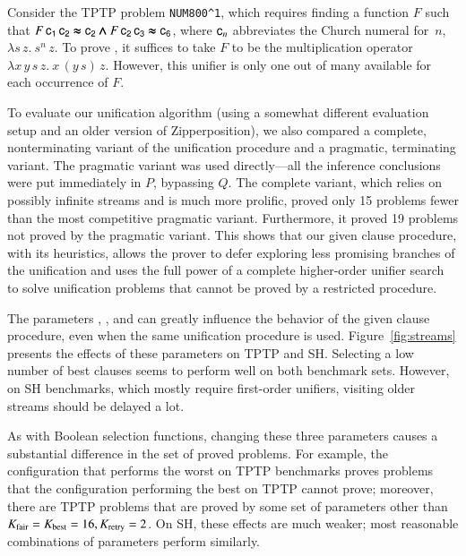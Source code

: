 Consider the TPTP problem \verb|NUM800^1|, which requires finding
a function $F$ such that $F \, \mathsf{c_1} \, \mathsf{c_2}
\pmb{\approx} \mathsf{c_2} \pmb{\land} F \, \mathsf{c_2} \, \mathsf{c_3} \pmb{\approx} \mathsf{c_6}$, where
$\mathsf{c}_n$ abbreviates the Church numeral for~$n$, $\lambda s\, z. \>
s^n \, z$. To prove
, it suffices to take $F$ to be the multiplication operator
$\lambda x \, y \, s \, z. \> x \, (y \, s) \, z$.
However, this unifier is only one out of many available for each occurrence of
$F$.

To evaluate our unification algorithm (using a somewhat different
evaluation setup and an older version of Zipperposition), we also compared a complete, nonterminating variant of the
unification procedure and a pragmatic, terminating variant. The
pragmatic variant was used directly---all the inference conclusions were put
immediately in $P$, bypassing $Q$. The complete variant, which relies on
possibly infinite streams and is much more prolific, proved only 15  problems
fewer than the most competitive pragmatic variant. Furthermore, it proved 19
problems not proved by the pragmatic variant.
%
This shows that our given clause procedure, with its heuristics, allows the
prover to defer exploring less promising branches of the unification and uses
the full power of a complete higher-order unifier search to solve unification
problems that cannot be proved by a restricted procedure.

The parameters \ParamMode{}, \ParamRetry{}, and \ParamMaxStreams{} can greatly
influence the behavior of the given clause procedure, even when the same
unification procedure is used. Figure~\ref{fig:streams}
presents the effects of these parameters on TPTP and SH.
Selecting a low number of best clauses seems to
perform well on both benchmark sets. However, on SH benchmarks, which mostly require 
first-order unifiers, visiting older streams should be delayed
a lot.

As with Boolean selection functions, changing these three parameters causes
a substantial difference in the set of proved problems. For example, the
configuration that performs the worst on TPTP benchmarks proves 
problems that the configuration performing the best on TPTP cannot prove; moreover, there
are  TPTP problems that are proved by some set of parameters
other than $K_{\mathrm{fair}}=K_{\mathrm{best}}=16, K_{\mathrm{retry}}=2$. On SH, these
effects are much weaker; most reasonable combinations
of parameters perform similarly.


